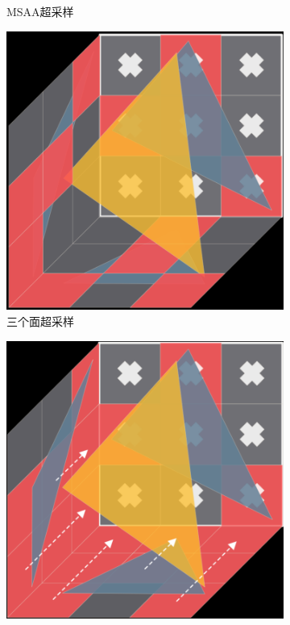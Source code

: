 \begin{figure}
\begin{fullwidth}
\begin{subfigure}[b]{0.2425\thewidth}
		\caption{MSAA超采样}
	\end{subfigure}
	\begin{subfigure}[b]{0.2425\thewidth}
		\includegraphics[width=\textwidth]{figures/vct/vct-voxel-3}
		\caption{三个面超采样}
	\end{subfigure}
	\begin{subfigure}[b]{0.2425\thewidth}
		\includegraphics[width=\textwidth]{figures/vct/vct-voxel-4}

\end{subfigure}
\end{fullwidth}
\end{figure}
